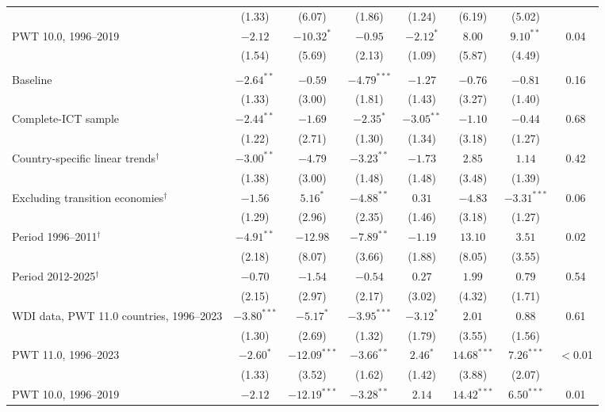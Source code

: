 \documentclass[preprint,12pt,authoryear]{elsarticle}
\begin{document}
\begin{table}[!p]
\begin{threeparttable}
\begin{tabular}{lccccccc}
 & (1.33) & (6.07) & (1.86) & (1.24) & (6.19) & (5.02) & \\
\quad PWT 10.0, 1996--2019 & $-2.12$ & $-10.32^{*}$ & $-0.95$ & $-2.12^{*}$ & $8.00$ & $9.10^{**}$ & 0.04\\
 & (1.54) & (5.69) & (2.13) & (1.09) & (5.87) & (4.49) & \\
\addlinespace
\multicolumn{8}{l}{\textit{Panel B. Moderator: initial log GDP per worker}}\\
\quad Baseline & $-2.64^{**}$ & $-0.59$ & $-4.79^{***}$ & $-1.27$ & $-0.76$ & $-0.81$ & 0.16\\
 & (1.33) & (3.00) & (1.81) & (1.43) & (3.27) & (1.40) & \\
\quad Complete-ICT sample & $-2.44^{**}$ & $-1.69$ & $-2.35^{*}$ & $-3.05^{**}$ & $-1.10$ & $-0.44$ & 0.68\\
 & (1.22) & (2.71) & (1.30) & (1.34) & (3.18) & (1.27) & \\
\quad Country-specific linear trends$^{\dagger}$ & $-3.00^{**}$ & $-4.79$ & $-3.23^{**}$ & $-1.73$ & $2.85$ & $1.14$ & 0.42\\
 & (1.38) & (3.00) & (1.48) & (1.48) & (3.48) & (1.39) & \\
\quad Excluding transition economies$^{\dagger}$ & $-1.56$ & $5.16^{*}$ & $-4.88^{**}$ & $0.31$ & $-4.83$ & $-3.31^{***}$ & 0.06\\
 & (1.29) & (2.96) & (2.35) & (1.46) & (3.18) & (1.27) & \\
\quad Period 1996--2011$^{\dagger}$ & $-4.91^{**}$ & $-12.98$ & $-7.89^{**}$ & $-1.19$ & $13.10$ & $3.51$ & 0.02\\
 & (2.18) & (8.07) & (3.66) & (1.88) & (8.05) & (3.55) & \\
\quad Period 2012-2025$^{\dagger}$ & $-0.70$ & $-1.54$ & $-0.54$ & $0.27$ & $1.99$ & $0.79$ & 0.54\\
 & (2.15) & (2.97) & (2.17) & (3.02) & (4.32) & (1.71) & \\
\quad WDI data, PWT 11.0 countries, 1996--2023 & $-3.80^{***}$ & $-5.17^{*}$ & $-3.95^{***}$ & $-3.12^{*}$ & $2.01$ & $0.88$ & 0.61\\
 & (1.30) & (2.69) & (1.32) & (1.79) & (3.55) & (1.56) & \\
\quad PWT 11.0, 1996--2023 & $-2.60^{*}$ & $-12.09^{***}$ & $-3.66^{**}$ & $2.46^{*}$ & $14.68^{***}$ & $7.26^{***}$ & $<$0.01\\
 & (1.33) & (3.52) & (1.62) & (1.42) & (3.88) & (2.07) & \\
\quad PWT 10.0, 1996--2019 & $-2.12$ & $-12.19^{***}$ & $-3.28^{**}$ & $2.14$ & $14.42^{***}$ & $6.50^{***}$ & 0.01\\

\end{tabular}
\end{threeparttable}
\end{table}
\end{document}
